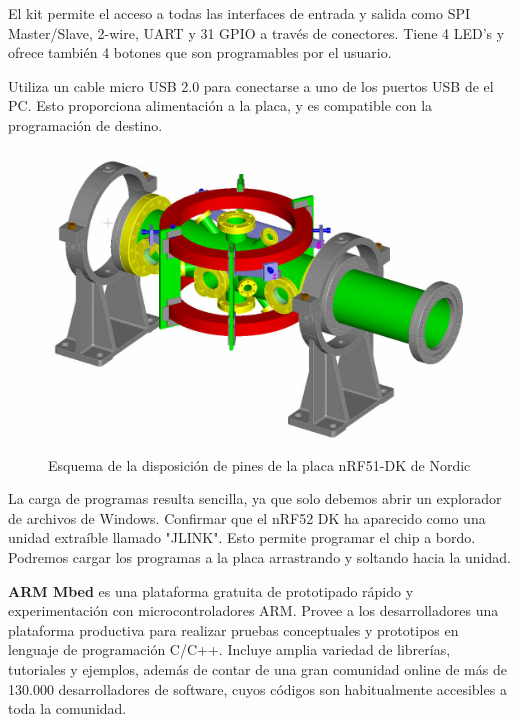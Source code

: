 El kit permite el acceso a todas las interfaces de entrada y salida como SPI Master/Slave, 2-wire, UART y 31 GPIO a través de conectores. Tiene 4 LED’s y ofrece también 4 botones que son programables por el usuario. 

Utiliza un cable micro USB 2.0 para conectarse a uno de los puertos USB de el PC. Esto proporciona alimentación a la placa, y es compatible con la programación de destino.

\begin{figure}[h]%
	\centering
    \includegraphics[scale=0.5]{figures/chamber.png} %

    \caption[Esquema de la disposición de pines de la placa nRF51-DK de Nordic]{Esquema de la disposición de pines de la placa nRF51-DK de Nordic}

   \label{figuraNordicNRF51}
\end{figure}

La  carga de programas resulta sencilla, ya que solo debemos abrir un explorador de archivos de Windows. Confirmar que el nRF52 DK ha aparecido como una unidad extraíble llamado "JLINK". Esto permite programar el chip a bordo. Podremos cargar los programas a la placa arrastrando y soltando hacia la unidad.

\textbf{ARM Mbed} es una plataforma gratuita de prototipado rápido y experimentación con microcontroladores ARM. Provee a los desarrolladores una plataforma productiva para realizar pruebas conceptuales y prototipos en lenguaje de programación C/C++. Incluye amplia variedad de librerías, tutoriales y ejemplos, además de contar de una gran comunidad online de más de 130.000 desarrolladores de software, cuyos códigos son habitualmente accesibles a toda la comunidad.

